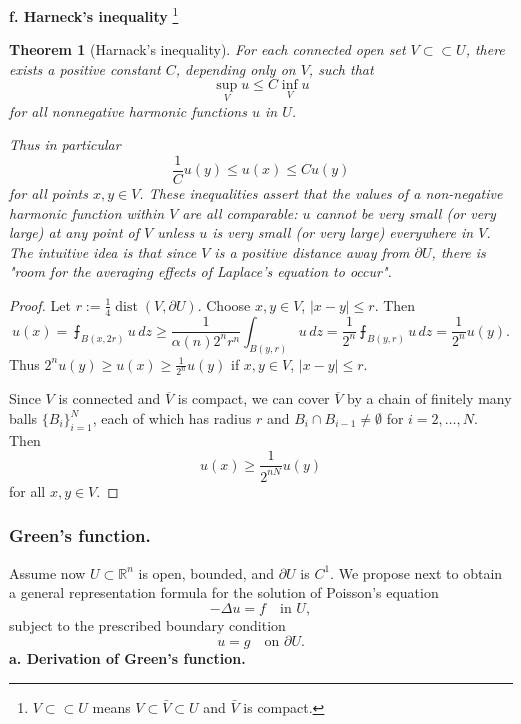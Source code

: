 \documentclass[a4paper,12pt]{report}
\newtheorem{theorem}{Theorem}[section]
\begin{document}
\noindent
\textbf{f. Harneck's inequality}
\footnote{\(V \subset \subset U\) means \(V \subset \bar{V} \subset U\) and \(\bar{V}\) is compact.}
\begin{theorem}[Harnack's inequality]
For each connected open set \( V \subset\subset U \), there exists a positive constant \( C \), depending only on \( V \), such that
\[
\sup_V u \leq C \inf_V u
\]
for all nonnegative harmonic functions \( u \) in \( U \).

Thus in particular
\[
\frac{1}{C} u(y) \leq u(x) \leq C u(y)
\]
for all points \( x, y \in V \). These inequalities assert that \textit{the values of a non-negative harmonic function within \( V \) are all comparable}: \( u \) cannot be very small (or very large) at any point of \( V \) unless \( u \) is very small (or very large) everywhere in \( V \). The intuitive idea is that since \( V \) is a positive distance away from \( \partial U \), there is "room for the averaging effects of Laplace's equation to occur".
\end{theorem}
\begin{proof}
Let \( r := \frac{1}{4} \operatorname{dist}(V, \partial U) \). Choose \( x, y \in V \), \( |x - y| \leq r \). Then
\[
u(x) = \intbar_{B(x, 2r)} u \, dz \geq \frac{1}{\alpha(n) 2^n r^n} \int_{B(y, r)} u \, dz = \frac{1}{2^n} \intbar_{B(y, r)} u \, dz = \frac{1}{2^n} u(y).
\]
Thus \( 2^n u(y) \geq u(x) \geq \frac{1}{2^n} u(y) \) if \( x, y \in V \), \( |x - y| \leq r \).

Since \( V \) is connected and \( \overline{V} \) is compact, we can cover \( \overline{V} \) by a chain of finitely many balls \( \{ B_i \}_{i=1}^N \), each of which has radius \( r \) and \( B_i \cap B_{i-1} \neq \emptyset \) for \( i = 2, \ldots, N \). Then
\[
u(x) \geq \frac{1}{2^{nN}} u(y)
\]
for all \( x, y \in V \).
\end{proof}
\subsubsection{Green's function.}

Assume now \( U \subset \mathbb{R}^n \) is open, bounded, and \( \partial U \) is \( C^1 \). We propose next to obtain a general representation formula for the solution of Poisson's equation
\[
-\Delta u = f \quad \text{in } U,
\]
subject to the prescribed boundary condition
\[
u = g \quad \text{on } \partial U.
\]
\noindent
\textbf{a. Derivation of Green's function.}
\end{document}
